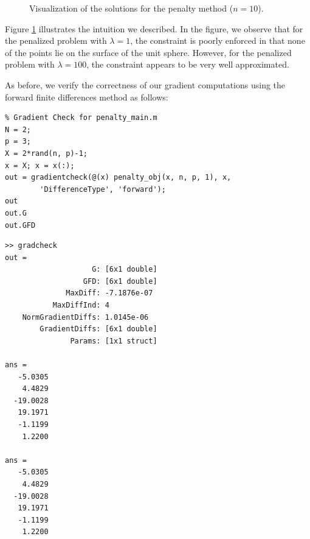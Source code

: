 \documentclass[11pt]{article}
\begin{document}
\begin{figure}[!htb]
  \centering
  \caption{Visualization of the solutions for the penalty method ($n=10$).}
  \label{fig:PenaltyResults}
\end{figure}

Figure \ref{fig:PenaltyResults} illustrates the intuition we described. In the figure, we observe that for the penalized problem with $\lambda=1$, the constraint is poorly enforced in that none of the points lie on the surface of the unit sphere. However, for the penalized problem with $\lambda=100$, the constraint appears to be very well approximated.

As before, we verify the correctness of our gradient computations using the forward finite differences method as follows:

\begin{lstlisting}
% Gradient Check for penalty_main.m
N = 2;
p = 3;
X = 2*rand(n, p)-1;
x = X; x = x(:);
out = gradientcheck(@(x) penalty_obj(x, n, p, 1), x,
		'DifferenceType', 'forward');
out
out.G
out.GFD
\end{lstlisting}

\begin{verbatim}
>> gradcheck
out = 
                    G: [6x1 double]
                  GFD: [6x1 double]
              MaxDiff: -7.1876e-07
           MaxDiffInd: 4
    NormGradientDiffs: 1.0145e-06
        GradientDiffs: [6x1 double]
               Params: [1x1 struct]

ans =
   -5.0305
    4.4829
  -19.0028
   19.1971
   -1.1199
    1.2200

ans =
   -5.0305
    4.4829
  -19.0028
   19.1971
   -1.1199
    1.2200
\end{verbatim}
\end{document}
